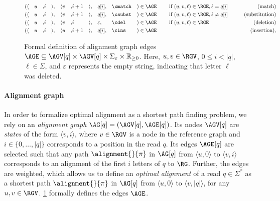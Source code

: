 \begin{figure}[t]
	\begin{alignat*}{20}
		(
			&\langle&& u &,& i   &\rangle&,
			&\langle&  v &,& i+1 &\rangle&,
			&&q[i],
			&&\cmatch
		&)&\in \AGE
		&& \quad \text{ if } (u,v,\ell) \in \RGE, \ell = q[i] & \qquad \text{(match)}\\
		(
			&\langle&& u &,& i   &\rangle&,
			&\langle&  v &,& i+1 &\rangle&,
			&&q[i],
			&&\csubst
		&) &\in \AGE
		&& \quad \text{ if } (u,v,\ell) \in \RGE, \ell \neq q[i] & \qquad \text{(substitution)}\\
		(
			&\langle&& u &,& i &\rangle&,
			&\langle&  v &,& i &\rangle&,
			&&\varepsilon,
			&&\cdel
		&) &\in \AGE
		&& \quad \text{ if } (u,v,\ell) \in \RGE & \qquad \text{(deletion)}\\
		(
			&\langle&& u &,& i   &\rangle&,
			&\langle&  u &,& i+1 &\rangle&,
			&&q[i],
			&&\cins
		&) &\in \AGE
		&& \quad & \qquad \text{(insertion)},
	\end{alignat*}
	\caption[Formal definition of alignment graph]{Formal definition of
	alignment graph edges $\AGE \subseteq \AGV[q] \times \AGV[q] \times
	\Sigma_\varepsilon \times \mathbb{R}_{\geq 0}$. Here, $u,v \in \RGV$, $0
	\leq i < |q|$, $\ell \in \Sigma$, and $\varepsilon$ represents the empty
	string, indicating that letter $\ell$ was deleted.}
	\label{SEEDfig:graph-edges}
\end{figure}

\paragraph{Alignment graph}
%
In order to formalize optimal alignment as a shortest path finding problem, we
rely on an \emph{alignment graph} $\AG[q]=(\AGV[q],\AGE[q])$.
%
Its nodes $\AGV[q]$ are \emph{states} of the form $\langle v, i \rangle$, where
$v \in \RGV$ is a node in the reference graph and $i \in \{0, \dots, |q|\}$
corresponds to a position in the read $q$.
%
Its edges $\AGE[q]$ are selected such that any path $\alignment{}{\pi}$ in
$\AG[q]$ from $\langle u, 0 \rangle$ to $\langle v, i \rangle$ corresponds to an
alignment of the first $i$ letters of $q$ to $\RG$.
%
Further, the edges are weighted, which allows us to define an \emph{optimal
alignment} of a read $q \in \Sigma^*$ as a shortest path $\alignment{}{\pi}$ in
$\AG[q]$ from $\langle u, 0 \rangle$ to $\langle v, |q| \rangle$, for any $u, v
\in \RGV$.
%
\cref{SEEDfig:graph-edges} formally defines the edges $\AGE$.

